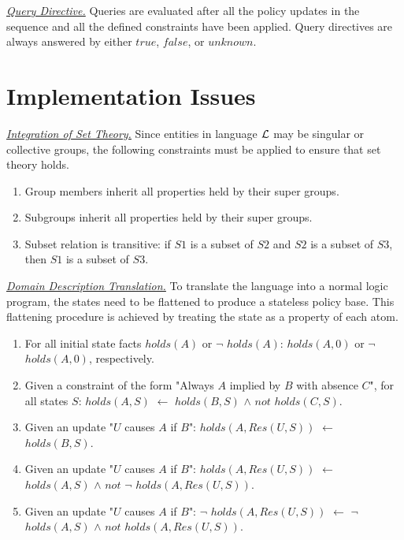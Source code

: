 \documentclass{llncs}
\begin{document}
    \noindent
    \underline{\emph{Query Directive.}}
    Queries are evaluated after all the policy updates in the sequence and all
    the defined constraints have been applied. Query directives are always
    answered by either $true$, $false$, or $unknown$.

  \section{Implementation Issues}

    \noindent
    \underline{\emph{Integration of Set Theory.}}
    Since entities in language $\cal{L}$ may be singular or collective groups,
    the following constraints must be applied to ensure that set theory holds.

    \begin{enumerate}
      \item
        Group members inherit all properties held by their super groups.
      \item
        Subgroups inherit all properties held by their super groups.
      \item
        Subset relation is transitive: if $S1$ is a subset of $S2$ and $S2$ is
        a subset of $S3$, then $S1$ is a subset of $S3$.
    \end{enumerate}

    \noindent
    \underline{\emph{Domain Description Translation.}}
    To translate the language into a normal logic program, the states need to
    be flattened to produce a stateless policy base. This flattening procedure
    is achieved by treating the state as a property of each atom.

    \begin{enumerate}
      \item
        For all initial state facts $holds(A)$ or $\lnot$ $holds(A)$: 
        $holds(A, 0)$ or $\lnot$ $holds(A, 0)$, respectively.
      \item
        Given a constraint of the form "Always $A$ implied by $B$ with
        absence $C$", for all states $S$:
        $holds(A, S)$ $\leftarrow$ $holds(B, S)$ $\land$ $not$ $holds(C, S)$.
      \item
        Given an update "$U$ causes $A$ if $B$":
        $holds(A, Res(U, S))$ $\leftarrow$ $holds(B, S)$.
      \item
        Given an update "$U$ causes $A$ if $B$":
        $holds(A, Res(U, S))$ $\leftarrow$ $holds(A, S)$ $\land$ $not$ $\lnot$
        $holds(A, Res(U, S))$.
      \item
        Given an update "$U$ causes $A$ if $B$":
        $\lnot$ $holds(A, Res(U, S))$ $\leftarrow$ $\lnot$ $holds(A, S)$
        $\land$ $not$ $holds(A, Res(U, S))$.
    \end{enumerate}
\end{document}
